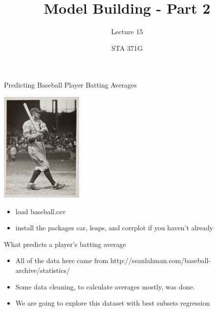 \documentclass{beamer}\usepackage[]{graphicx}\usepackage[]{color}
\title{Model Building - Part 2}
\subtitle{Lecture 15}
\author{STA 371G}
\begin{document}
  
  

  \frame{\maketitle}



  \begin{darkframes}
    
    \begin{frame}{Predicting Baseball Player Batting Averages}
      \fontsize{10}{10}\selectfont
      \begin{center}
        \includegraphics[width=1.6in]{TyCobb.png} \\
      \end{center}

      \begin{itemize}
        \item load baseball.csv
        \item install the packages car, leaps, and corrplot if you haven't already
      \end{itemize}
      
      \lc %
    \end{frame}


    \begin{frame}[fragile]{What predicts a player's batting average}
      \begin{itemize}[<+->]
        \item All of the data here came from http://seanlahman.com/baseball-archive/statistics/
        \item Some data cleaning, to calculate averages mostly, was done.
        \item We are going to explore this dataset with best subsets regression
        \end{itemize} 
    \end{frame}



\end{darkframes}
\end{document}
